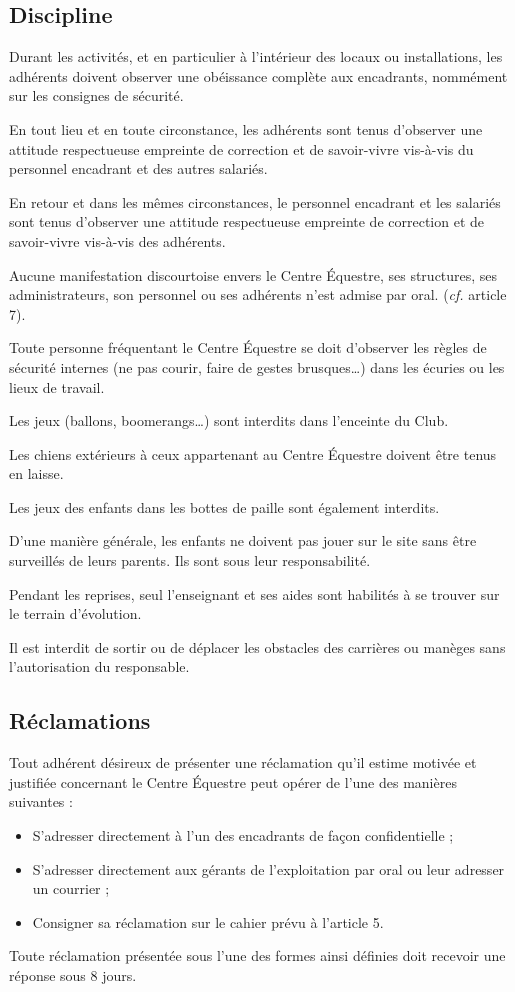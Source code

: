 \documentclass[11pt,a4paper]{article}
\begin{document}
\subsection{Discipline}\label{subsec:discipline}
Durant les activités, et en particulier à l'intérieur des locaux ou installations, les adhérents doivent observer une obéissance complète aux encadrants, nommément sur les consignes de sécurité.

En tout lieu et en toute circonstance, les adhérents sont tenus d'observer une attitude respectueuse empreinte de correction et de savoir-vivre vis-à-vis du personnel encadrant et des autres salariés.

En retour et dans les mêmes circonstances, le personnel encadrant et les salariés sont tenus d'observer une attitude respectueuse empreinte de correction et de savoir-vivre vis-à-vis des adhérents.

Aucune manifestation discourtoise envers le Centre Équestre, ses structures, ses administrateurs, son personnel ou ses adhérents n'est admise par oral.
(\textit{cf.} article 7).

Toute personne fréquentant le Centre Équestre se doit d'observer les règles de sécurité internes (ne pas courir, faire de gestes brusques\dots) dans les écuries ou les lieux de travail.

Les jeux (ballons, boomerangs\dots) sont interdits dans l'enceinte du Club.\par
Les chiens extérieurs à ceux appartenant au Centre Équestre doivent être tenus en laisse.\par
Les jeux des enfants dans les bottes de paille sont également interdits.

D'une manière générale, les enfants ne doivent pas jouer sur le site sans être surveillés de leurs parents.
Ils sont sous leur responsabilité.

Pendant les reprises, seul l'enseignant et ses aides sont habilités à se trouver sur le terrain d'évolution.

Il est interdit de sortir ou de déplacer les obstacles des carrières ou manèges sans l'autorisation du responsable.

\subsection{Réclamations}\label{subsec:reclamations}
Tout adhérent désireux de présenter une réclamation qu'il estime motivée et justifiée concernant le Centre Équestre peut opérer de l'une des manières suivantes :
\begin{itemize}[leftmargin=50pt]
\item
S'adresser directement à l'un des encadrants de façon confidentielle ;
\item
S'adresser directement aux gérants de l'exploitation par oral ou leur adresser un courrier ;
\item
Consigner sa réclamation sur le cahier prévu à l'article 5.
\end{itemize}
Toute réclamation présentée sous l'une des formes ainsi définies doit recevoir une réponse sous 8 jours.
\end{document}
